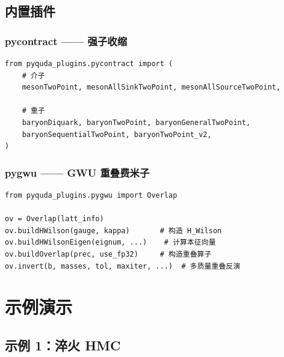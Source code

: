 \documentclass[12pt,a4paper]{ctexart}
\begin{document}
\subsection{内置插件}

\subsubsection{pycontract —— 强子收缩}

\begin{lstlisting}[style=pycode]
from pyquda_plugins.pycontract import (
    # 介子
    mesonTwoPoint, mesonAllSinkTwoPoint, mesonAllSourceTwoPoint,

    # 重子
    baryonDiquark, baryonTwoPoint, baryonGeneralTwoPoint,
    baryonSequentialTwoPoint, baryonTwoPoint_v2,
)
\end{lstlisting}

\subsubsection{pygwu —— GWU 重叠费米子}

\begin{lstlisting}[style=pycode]
from pyquda_plugins.pygwu import Overlap

ov = Overlap(latt_info)
ov.buildHWilson(gauge, kappa)       # 构造 H_Wilson
ov.buildHWilsonEigen(eignum, ...)    # 计算本征向量
ov.buildOverlap(prec, use_fp32)     # 构造重叠算子
ov.invert(b, masses, tol, maxiter, ...)  # 多质量重叠反演
\end{lstlisting}

\section{示例演示}

\subsection{示例 1：淬火 HMC}
\end{document}
